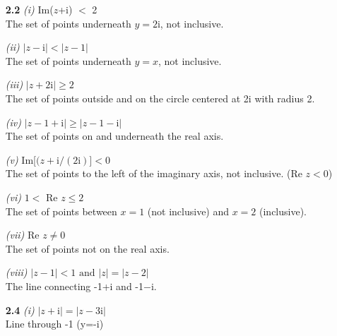 \begin{enumerate}

\item[\textbf{2.2}]
\textit{(i)} Im($z$+i) $<$ 2 \\
The set of points underneath $y = 2$i, not inclusive.

\textit{(ii)} $|z-\mathrm{i}| < |z-1|$ \\
The set of points underneath $y = x$, not inclusive.

\textit{(iii)} $|z+2\mathrm{i}| \ge 2$ \\
The set of points outside and on the circle centered at 2i with radius 2.

\textit{(iv)} $|z-1+\mathrm{i}| \ge |z-1-\mathrm{i}|$ \\
The set of points on and underneath the real axis.

\textit{(v)} Im[$(z+\mathrm{i}/(2\mathrm{i})] < 0$ \\
The set of points to the left of the imaginary axis, not inclusive. (Re $z < 0$)

\textit{(vi)} $1 < $ Re $z \le2$ \\
The set of points between $x=1$ (not inclusive) and $x=2$ (inclusive).

\textit{(vii)} Re $z\ne0$ \\
The set of points not on the real axis.

\textit{(viii)} $|z-1| < 1 \text{ and } |z| = |z-2|$ \\
The line connecting -1+i and -1$-$i.
\\
\item[\textbf{2.4}]
\textit{(i)} $|z+\mathrm{i}| = |z-3\mathrm{i}|$ \\
Line through -1 (y=-i)


\end{enumerate}
